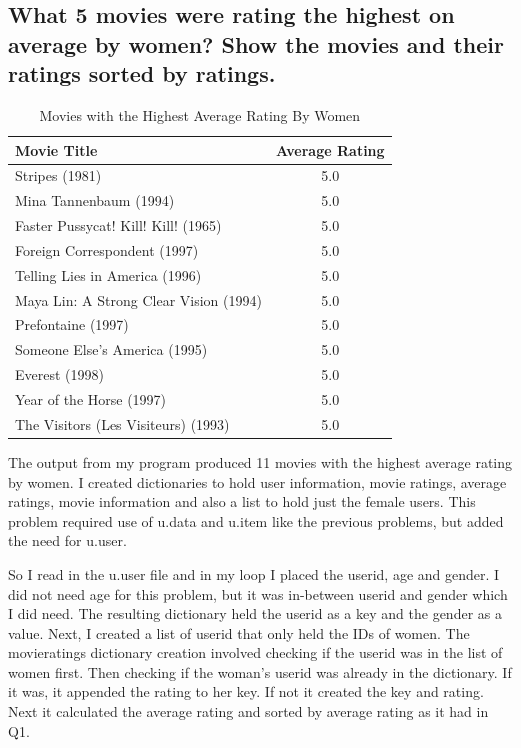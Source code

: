 \documentclass{article}
\begin{document}
\newpage
\subsection{What 5 movies were rating the highest on average by women? Show the movies and their ratings sorted by ratings.}

\begin{table}[!h]
\centering
\begin{tabular}{l c}
Movie Title & Average Rating \\
\hline
Stripes (1981) & 5.0  \\
Mina Tannenbaum (1994) & 5.0  \\
Faster Pussycat! Kill! Kill! (1965) & 5.0  \\
Foreign Correspondent (1997) & 5.0  \\
Telling Lies in America (1996) & 5.0  \\
Maya Lin: A Strong Clear Vision (1994) & 5.0  \\
Prefontaine (1997) & 5.0  \\
Someone Else's America (1995) & 5.0  \\
Everest (1998) & 5.0  \\
Year of the Horse (1997) & 5.0  \\
The Visitors (Les Visiteurs) (1993) & 5.0 \\
\hline
\end{tabular}
\caption{Movies with the Highest Average Rating By Women}
\end{table}

The output from my program produced 11 movies with the highest average rating by women. I created dictionaries to hold user information, movie ratings, average ratings, movie information and also a list to hold just the female users. This problem required use of u.data and u.item like the previous problems, but added the need for u.user.

So I read in the u.user file and in my loop I placed the userid, age and gender. I did not need age for this problem, but it was in-between userid and gender which I did need. The resulting dictionary held the userid as a key and the gender as a value. Next, I created a list of userid that only held the IDs of women. The movieratings dictionary creation involved checking if the userid was in the list of women first. Then checking if the woman's userid was already in the dictionary. If it was, it appended the rating to her key. If not it created the key and rating. Next it calculated the average rating and sorted by average rating as it had in Q1. 
\end{document}
